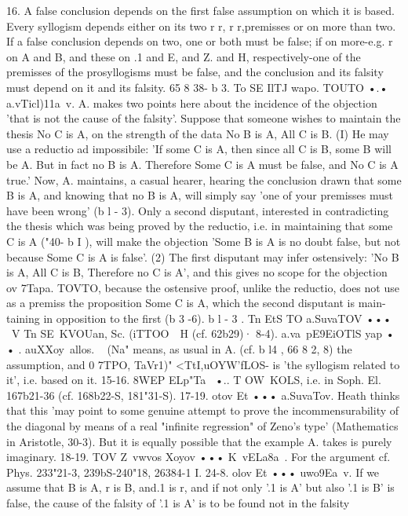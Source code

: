 {{{{{{16. A false conclusion depends on the first false assumption
on which it is based. Every syllogism depends either on its two
r
r,
r
r,premisses or on more than two. If a false conclusion depends on
two, one or both must be false; if on more-e.g. r on A and B,
and these on .1 and E, and Z. and H, respectively-one of the
premisses of the prosyllogisms must be false, and the conclusion
and its falsity must depend on it and its falsity.
65 8 38- b 3. To SE IlTJ wapo. TOUTO •.• a.vTicl)11a~v. A. makes two
points here about the incidence of the objection 'that is not the
cause of the falsity'. Suppose that someone wishes to maintain
the thesis No C is A, on the strength of the data No B is A, All C
is B. (I) He may use a reductio ad impossibile: 'If some C is A,
then since all C is B, some B will be A. But in fact no B is A.
Therefore Some C is A must be false, and No C is A true.' Now,
A. maintains, a casual hearer, hearing the conclusion drawn that
some B is A, and knowing that no B is A, will simply say 'one of
your premisses must have been wrong' (b l - 3). Only a second
disputant, interested in contradicting the thesis which was being
proved by the reductio, i.e. in maintaining that some C is A ("40-
b I ), will make the objection 'Some B is A is no doubt false, but
not because Some C is A is false'. (2) The first disputant may
infer ostensively: 'No B is A, All C is B, Therefore no C is A',
and this gives no scope for the objection ov 7Tapa. TOVTO, because
the ostensive proof, unlike the reductio, does not use as a premiss
the proposition Some C is A, which the second disputant is main-
taining in opposition to the first (b 3 -6).
b l - 3 . Tn EtS TO a.SuvaTOV ••• ~V Tn SE~KVOUan, Sc. (iTTOO~~H (cf.
62b29)·
8-4). a.va~pE9EiOTlS yap • • . auXXoy~allos. ~ (Na" means, as
usual in A. (cf. b l4 , 66 8 2, 8) the assumption, and 0 7TPO, TaVr1)"
<TtI,uOYW'fLOS- is 'the syllogism related to it', i.e. based on it.
15-16. 8WEP ELp"Ta~ •.. T OW~KOLS, i.e. in Soph. El. 167b21-36
(cf. 168b22-S, 181"31-S).
17-19. otov Et ••• a.SuvaTov. Heath thinks that this 'may point
to some genuine attempt to prove the incommensurability of the
diagonal by means of a real "infinite regression" of Zeno's type'
(Mathematics in Aristotle, 30-3). But it is equally possible that
the example A. takes is purely imaginary.
18-19. TOV Z~vwvos Xoyov ••• K~vELa8a~. For the argument
cf. Phys. 233"21-3, 239bS-240"18, 26384-1 I.
24-8. olov Et ••• uwo9Ea~v. If we assume that B is A, r is B,
and.1 is r, and if not only '.1 is A' but also '.1 is B' is false, the
cause of the falsity of '.1 is A' is to be found not in the falsity
}}}}}}
